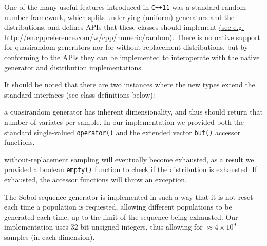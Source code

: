 \documentclass{JASSS}
\begin{document}
One of the many useful features introduced in \texttt{C++11} was a
standard random number framework, which splits underlying (uniform) generators
and the distributions, and defines APIs that these classes should
implement \href{http://en.cppreference.com/w/cpp/numeric/random}{(see
e.g. http://en.cppreference.com/w/cpp/numeric/random)}. There is no
native support for quasirandom generators nor for without-replacement
distributions, but by conforming to the APIs they can be implemented to
interoperate with the native generator and distribution implementations.

It should be noted that there are two instances where the new types
extend the standard interfaces (see class definitions below):

\begin{itemize*}
\item
  a quasirandom generator has inherent dimensionality, and thus should
  return that number of variates per sample. In our implementation we
  provided both the standard single-valued \texttt{operator()} and the
  extended vector \texttt{buf()} accessor functions.
\item
  without-replacement sampling will eventually become exhausted, as a
  result we provided a boolean \texttt{empty()} function to check if the
  distribution is exhausted. If exhausted, the accessor functions will
  throw an exception.
\end{itemize*}

The Sobol sequence generator is implemented in such a way that it is not reset
each time a population is requested, allowing different populations to
be generated each time, up to the limit of the sequence being exhausted.
Our implementation uses 32-bit unsigned integers, thus allowing for
\(\approx4\times10^9\) samples (in each dimension).
\end{document}
